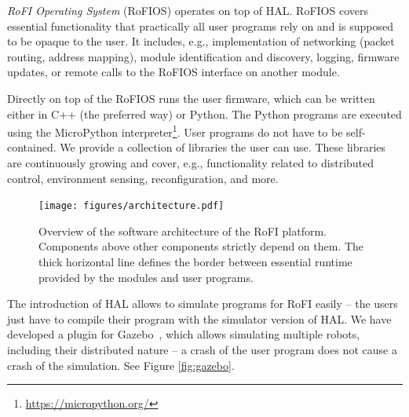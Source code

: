 \emph{RoFI Operating System} (RoFIOS) operates on top of HAL. RoFIOS covers
essential functionality that practically all user programs rely on and is
supposed to be opaque to the user. It includes, e.g., implementation of
networking (packet routing, address mapping), module identification and
discovery, logging, firmware updates, or remote calls to the RoFIOS interface on
another module.

Directly on top of the RoFIOS runs the user firmware, which can be written
either in C++ (the preferred way) or Python. The Python programs are executed
using the MicroPython interpreter\footnote{\url{https://micropython.org/}}. User
programs do not have to be self-contained. We provide a collection of libraries
the user can use. These libraries are continuously growing and cover, e.g.,
functionality related to distributed control, environment sensing,
reconfiguration, and more.

\begin{figure}[t]
   \centering
   \texttt{[image: figures/architecture.pdf]}
   \caption{Overview of the software architecture of the RoFI platform.
   Components above other components strictly depend on them. The thick
   horizontal line defines the border between essential runtime provided by the
   modules and user programs.}
   \label{fig:architecture}
\end{figure}

The introduction of HAL allows to simulate programs for RoFI easily -- the users
just have to compile their program with the simulator version of HAL. We have
developed a plugin for Gazebo~\cite{Gazebo}, which allows simulating multiple
robots, including their distributed nature -- a crash of the user program does
not cause a crash of the simulation. See Figure \ref{fig:gazebo}.

